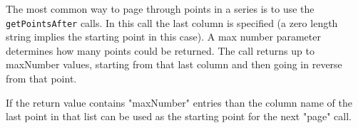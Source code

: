 The most common way to page through points in a series is to use the \verb+getPointsAfter+ calls. In this call
the last column is specified (a zero length string implies the starting point in this case). A max number parameter
determines how many points could be returned. The call returns up to maxNumber values, starting from that last column
and then going in reverse from that point.

If the return value contains "maxNumber" entries than the column name of the last point in that list can be
used as the starting point for the next "page" call.
